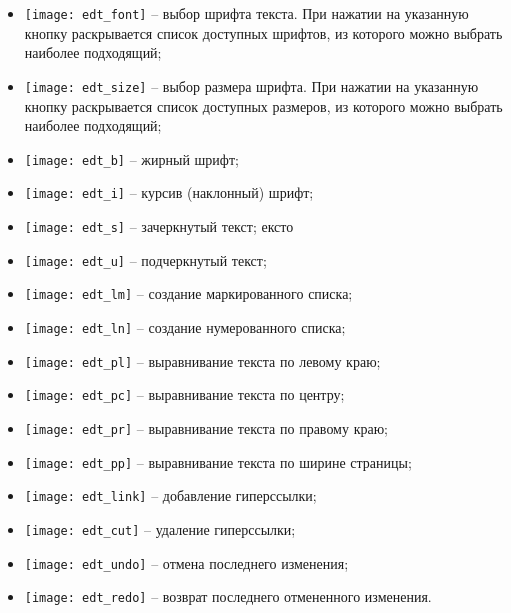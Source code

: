 {\begin{enumerate}
 \begin{itemize}
  \item \texttt{[image: edt\_font]} -- выбор шрифта текста. При нажатии на указанную кнопку раскрывается список доступных шрифтов, из которого можно выбрать наиболее подходящий;
  \item \texttt{[image: edt\_size]} -- выбор размера шрифта. При нажатии на указанную кнопку раскрывается список доступных размеров, из которого можно выбрать наиболее подходящий; 
  \item \texttt{[image: edt\_b]} -- жирный шрифт; 
  \item \texttt{[image: edt\_i]} -- курсив (наклонный) шрифт;
  \item \texttt{[image: edt\_s]} -- зачеркнутый текст; ексто
  \item \texttt{[image: edt\_u]} -- подчеркнутый текст;
  \item \texttt{[image: edt\_lm]} -- создание маркированного списка;
  \item \texttt{[image: edt\_ln]} -- создание нумерованного списка;
  \item \texttt{[image: edt\_pl]} -- выравнивание текста по левому краю;
  \item \texttt{[image: edt\_pc]} -- выравнивание текста по центру;
  \item \texttt{[image: edt\_pr]} -- выравнивание текста по правому краю;
  \item \texttt{[image: edt\_pp]} -- выравнивание текста по ширине страницы; 
  \item \texttt{[image: edt\_link]} -- добавление гиперссылки;
  \item \texttt{[image: edt\_cut]} -- удаление гиперссылки;
  \item \texttt{[image: edt\_undo]} -- отмена последнего изменения;
  \item \texttt{[image: edt\_redo]} -- возврат последнего отмененного изменения.      
 \end{itemize}
 

\end{enumerate}}
